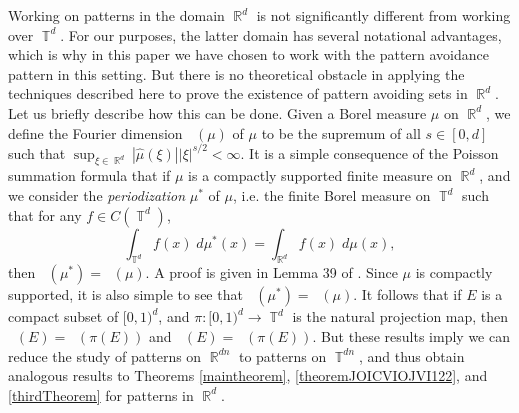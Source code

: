 \documentclass[dvipsnames,letterpaper,12pt]{article}
\numberwithin{equation}{section}
\DeclareMathOperator{\hausdim}{\dim_{\mathbb{H}}}
\DeclareMathOperator{\fordim}{\dim_{\mathbb{F}}}
\DeclareMathOperator{\RR}{\mathbb{R}}
\DeclareMathOperator{\TT}{\mathbb{T}}
\numberwithin{theorem}{section}
\begin{document}
Working on patterns in the domain $\RR^d$ is not significantly different from working over $\TT^d$. For our purposes, the latter domain has several notational advantages, which is why in this paper we have chosen to work with the pattern avoidance pattern in this setting. But there is no theoretical obstacle in applying the techniques described here to prove the existence of pattern avoiding sets in $\RR^d$. Let us briefly describe how this can be done. Given a Borel measure $\mu$ on $\RR^d$, we define the Fourier dimension $\fordim(\mu)$ of $\mu$ to be the supremum of all $s \in [0,d]$ such that $\sup_{\xi \in \RR^d} |\widehat{\mu}(\xi)| |\xi|^{s/2} < \infty$. It is a simple consequence of the Poisson summation formula that if $\mu$ is a compactly supported finite measure on $\RR^d$, and we consider the \emph{periodization} $\mu^*$ of $\mu$, i.e. the finite Borel measure on $\TT^d$ such that for any $f \in C(\TT^d)$,
%
\begin{equation}
    \int_{\TT^d} f(x)\; d\mu^*(x) = \int_{\RR^d} f(x)\; d\mu(x),
\end{equation}
%
then $\fordim(\mu^*) = \fordim(\mu)$. A proof is given in Lemma 39 of \cite{MyThesis}. Since $\mu$ is compactly supported, it is also simple to see that $\hausdim(\mu^*) = \hausdim(\mu)$. It follows that if $E$ is a compact subset of $[0,1)^d$, and $\pi: [0,1)^d \to \TT^d$ is the natural projection map, then $\fordim(E) = \fordim(\pi(E))$ and $\hausdim(E) = \hausdim(\pi(E))$. But these results imply we can reduce the study of patterns on $\RR^{dn}$ to patterns on $\TT^{dn}$, and thus obtain analogous results to Theorems \ref{maintheorem}, \ref{theoremJOICVIOJVI122}, and \ref{thirdTheorem} for patterns in $\RR^d$.

\begin{comment}
It is expected that Theorem \ref{theoremJOICVIOJVI122} is tight for general patterns $Z$. If $E$ is Salem and has dimension $d/(n-1)$, then $f(E^n)$ is a subset of $\TT^{d(n-1)}$ with nonempty interior, because
%
\begin{align*}
    \int e^{-2 \pi i \xi \cdot y} df_*(\mu^{\otimes})(y) &= \int e^{-2 \pi i \xi \cdot f(x)} d\mu(x_1) \dots d\mu(x_n)\\
    &= \lim_{k \to \infty} \int e^{-2 \pi i \xi \cdot f(x)} \phi^{\otimes}_k(x) dx\\
    &= \lim_{k \to \infty} \int e^{-2 \pi i \xi \cdot (x_1 + \dots + x_n)} \det(D_{x_1} f) \phi_k(g(z,x_2,\dots,x_n)) \phi_k^{\otimes}(x)\; dx
\end{align*}
%
where $f(g(z,x_2,\dots,x_n),x_2,\dots,x_n) = z$.
On the other hand, for patterns with richer structure this result is certainly non-optimal. For instance, in BLAH a Salem set in $\RR$ of dimension one is constructed avoiding solutions to the equation $x_3 = 2x_2 - x_1$; our techniques only guarantee the existence of a Salem set of dimension $1/2$.
\end{comment}
\end{document}
